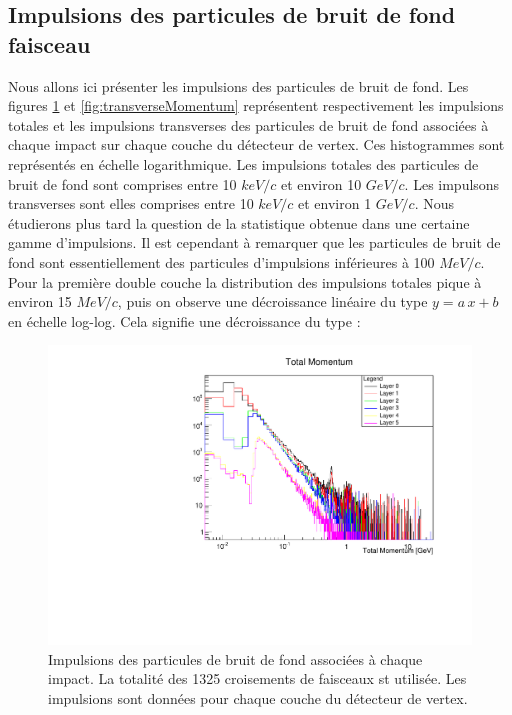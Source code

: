   \FloatBarrier
  
  \subsection{Impulsions des particules de bruit de fond faisceau}

  Nous allons ici pr\'esenter les impulsions des particules de bruit de fond. Les figures \ref{fig:totalMomentum} et \ref{fig:transverseMomentum} repr\'esentent respectivement les impulsions totales et les impulsions transverses des particules de bruit de fond associ\'ees \`a chaque impact sur chaque couche du d\'etecteur de vertex. Ces histogrammes sont repr\'esent\'es en \'echelle logarithmique. Les impulsions totales des particules de bruit de fond sont comprises entre 10 $keV/c$ et environ 10 $GeV/c$. Les impulsons transverses sont elles comprises entre 10 $keV/c$ et environ 1 $GeV/c$. Nous \'etudierons plus tard la question de la statistique obtenue dans une certaine gamme d'impulsions. Il est cependant \`a remarquer que les particules de bruit de fond sont essentiellement des particules d'impulsions inf\'erieures \`a 100 $MeV/c$. Pour la premi\`ere double couche la distribution des impulsions totales pique \`a environ 15 $MeV/c$, puis on observe une d\'ecroissance lin\'eaire du type $y = a \, x + b$ en \'echelle log-log. Cela signifie une d\'ecroissance du type : 
  
  \begin{figure}[!htb]
    \begin{center}
      \includegraphics[scale=0.50]{./figures/Beamstrahlung/Total_Momentum_vs_Layers.pdf}
      \caption{Impulsions des particules de bruit de fond associ\'ees \`a chaque impact. La totalit\'e des 1325 croisements de faisceaux st utilis\'ee. Les impulsions sont donn\'ees pour chaque couche du d\'etecteur de vertex.}
      \label{fig:totalMomentum}
    \end{center}
  \end{figure} 


